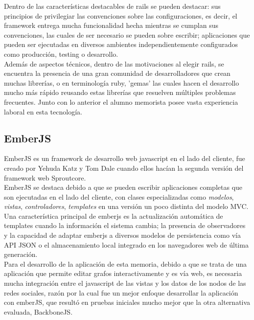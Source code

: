 Dentro de las características destacables de rails se pueden destacar: sus principios de privilegiar las convenciones sobre las configuraciones, es decir, el framework entrega mucha funcionalidad hecha mientras se cumplan sus convenciones, las cuales de ser necesario se pueden sobre escribir; aplicaciones que pueden ser ejecutadas en diversos ambientes independientemente configurados como producción, testing o desarrollo.\\

Además de aspectos técnicos, dentro de las motivaciones al elegir rails, se encuentra la presencia de una gran comunidad de desarrolladores que crean muchas librerías, o en terminología ruby, 'gemas' las cuales hacen el desarrollo mucho más rápido reusando estas librerías que resuelven múltiples problemas frecuentes. Junto con lo anterior el alumno memorista posee vasta experiencia laboral en esta tecnología.

\subsection{EmberJS} %
\label{sub:emberjs}

EmberJS es un framework de desarrollo web javascript en el lado del cliente, fue creado por Yehuda Katz y Tom Dale cuando ellos hacían la segunda versión del framework web Sproutcore.\\

EmberJS se destaca debido a que se pueden escribir aplicaciones completas que son ejecutadas en el lado del cliente, con clases especializadas como \emph{modelos}, \emph{vistas}, \emph{controladores}, \emph{templates} en una versión un poco distinta del modelo MVC. Una característica principal de emberjs es la actualización automática de templates cuando la información el sistema cambia; la presencia de observadores y la capacidad de adaptar emberjs a diversos modelos de persistencia como vía API JSON o el almacenamiento local integrado en los navegadores web de última generación.\\

Para el desarrollo de la aplicación de esta memoria, debido a que se trata de una aplicación que permite editar grafos interactivamente y es vía web, es necesaria mucha integración entre el javascript de las vistas y los datos de los nodos de las redes sociales, razón por la cual fue un mejor enfoque desarrollar la aplicación con emberJS, que resultó en pruebas iniciales mucho mejor que la otra alternativa evaluada, BackboneJS\cite{backbone}.\\

